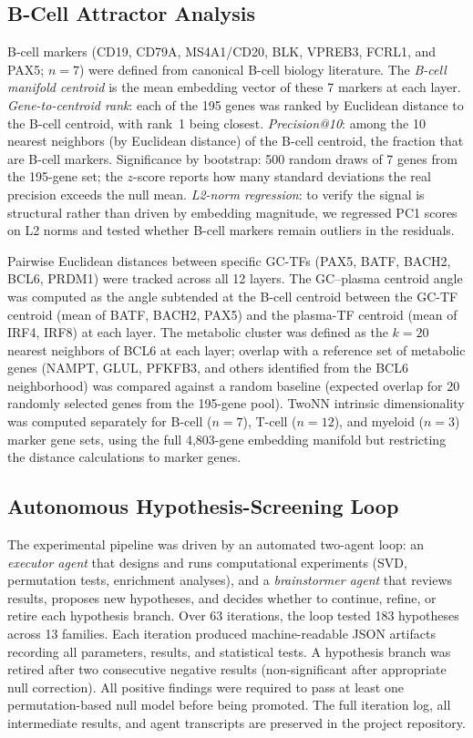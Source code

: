\documentclass[10pt,twocolumn]{article}
\begin{document}
\subsection{B-Cell Attractor Analysis}
B-cell markers (CD19, CD79A, MS4A1/CD20, BLK, VPREB3, FCRL1, and PAX5; $n = 7$) were defined from canonical B-cell biology literature.
The \emph{B-cell manifold centroid} is the mean embedding vector of these 7 markers at each layer.
\emph{Gene-to-centroid rank}: each of the 195 genes was ranked by Euclidean distance to the B-cell centroid, with rank~1 being closest.
\emph{Precision@10}: among the 10 nearest neighbors (by Euclidean distance) of the B-cell centroid, the fraction that are B-cell markers.
Significance by bootstrap: 500 random draws of 7 genes from the 195-gene set; the $z$-score reports how many standard deviations the real precision exceeds the null mean.
\emph{L2-norm regression}: to verify the signal is structural rather than driven by embedding magnitude, we regressed PC1 scores on L2 norms and tested whether B-cell markers remain outliers in the residuals.

Pairwise Euclidean distances between specific GC-TFs (PAX5, BATF, BACH2, BCL6, PRDM1) were tracked across all 12 layers.
The GC--plasma centroid angle was computed as the angle subtended at the B-cell centroid between the GC-TF centroid (mean of BATF, BACH2, PAX5) and the plasma-TF centroid (mean of IRF4, IRF8) at each layer.
The metabolic cluster was defined as the $k = 20$ nearest neighbors of BCL6 at each layer; overlap with a reference set of metabolic genes (NAMPT, GLUL, PFKFB3, and others identified from the BCL6 neighborhood) was compared against a random baseline (expected overlap for 20 randomly selected genes from the 195-gene pool).
TwoNN intrinsic dimensionality was computed separately for B-cell ($n = 7$), T-cell ($n = 12$), and myeloid ($n = 3$) marker gene sets, using the full 4{,}803-gene embedding manifold but restricting the distance calculations to marker genes.

\subsection{Autonomous Hypothesis-Screening Loop}
The experimental pipeline was driven by an automated two-agent loop: an \emph{executor agent} that designs and runs computational experiments (SVD, permutation tests, enrichment analyses), and a \emph{brainstormer agent} that reviews results, proposes new hypotheses, and decides whether to continue, refine, or retire each hypothesis branch.
Over 63 iterations, the loop tested 183 hypotheses across 13 families.
Each iteration produced machine-readable JSON artifacts recording all parameters, results, and statistical tests.
A hypothesis branch was retired after two consecutive negative results (non-significant after appropriate null correction).
All positive findings were required to pass at least one permutation-based null model before being promoted.
The full iteration log, all intermediate results, and agent transcripts are preserved in the project repository.
\end{document}
